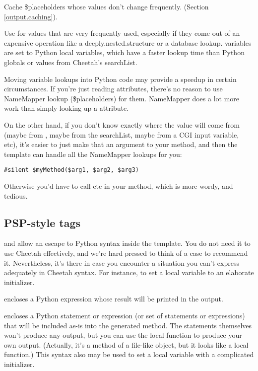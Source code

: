 Cache \$placeholders whose values don't change frequently.  (Section
\ref{output.caching}).

Use  for values that are very frequently used, especially if they
come out of an expensive operation like a deeply.nested.structure or a database
lookup.   variables are set to Python local variables, which have a
faster lookup time than Python globals or values from Cheetah's searchList.

Moving variable lookups into Python code may provide a speedup in certain
circumstances.  If you're just reading  attributes, there's no
reason to use NameMapper lookup (\$placeholders) for them.  NameMapper does
a lot more work than simply looking up a  attribute.  

On the other hand, if you don't know exactly where the value will come from
(maybe from , maybe from the searchList, maybe from a CGI input
variable, etc), it's easier to just make that an argument to your method, and
then the template can handle all the NameMapper lookups for you:
\begin{verbatim}
#silent $myMethod($arg1, $arg2, $arg3)
\end{verbatim}
Otherwise you'd have to call  etc in your
method, which is more wordy, and tedious.



\subsection{PSP-style tags}
\label{tips.PSP}

\code{<\%= \ldots \%>} and \code{<\% \ldots \%>} allow an escape
to Python syntax inside the template.  You do not need it to use Cheetah
effectively, and we're hard pressed to think of a case to recommend it.
Nevertheless, it's there in case you encounter a situation you can't
express adequately in Cheetah syntax.  For instance, to set a local
variable to an elaborate initializer.  

\code{<\%= \ldots \%>} encloses a Python expression whose result will
be printed in the output.  

\code{<\% \ldots \%>} encloses a Python statement or expression (or set of
statements or expressions) that will be included as-is into the generated
method.  The statements themselves won't produce any output, but you can use
the local function  to produce your own output.
(Actually, it's a method of a file-like object, but it looks like a local
function.) This syntax also may be used to set a local variable with a
complicated initializer.

